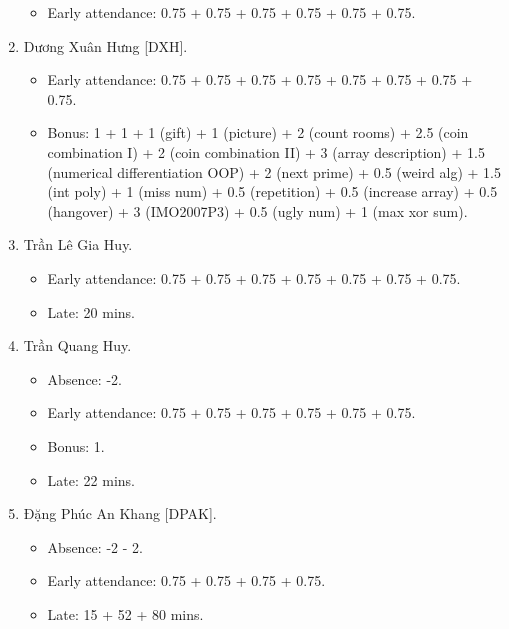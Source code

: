 \documentclass{article}
\begin{document}
\begin{enumerate}
\begin{itemize}
		\item Early attendance: 0.75 + 0.75 + 0.75 + 0.75 + 0.75 + 0.75.
	\end{itemize}
	\item {\sc Dương Xuân Hưng [DXH].}
	\begin{itemize}
		\item Early attendance: 0.75 + 0.75 + 0.75 + 0.75 + 0.75 + 0.75 + 0.75 + 0.75.
		\item Bonus: 1 + 1 + 1 (gift) + 1 (picture) + 2 (count rooms) + 2.5 (coin combination I) + 2 (coin combination II) + 3 (array description) + 1.5 (numerical differentiation OOP) + 2 (next prime) + 0.5 (weird alg) + 1.5 (int poly) + 1 (miss num) + 0.5 (repetition) + 0.5 (increase array) + 0.5 (hangover) + 3 (IMO2007P3) + 0.5 (ugly num) + 1 (max xor sum).
	\end{itemize}
	\item {\sc Trần Lê Gia Huy.}
	\begin{itemize}
		\item Early attendance: 0.75 + 0.75 + 0.75 + 0.75 + 0.75 + 0.75 + 0.75.
        \item Late: 20 mins.
	\end{itemize}
	\item {\sc Trần Quang Huy.}
	\begin{itemize}
		\item Absence: -2.
		\item Early attendance: 0.75 + 0.75 + 0.75 + 0.75 + 0.75 + 0.75.
        \item Bonus: 1.
        \item Late: 22 mins.
	\end{itemize}
	\item {\sc Đặng Phúc An Khang [DPAK].}
	\begin{itemize}
        \item Absence: -2 - 2.
		\item Early attendance: 0.75 + 0.75 + 0.75 + 0.75.
		\item Late: 15 + 52 + 80 mins.

\end{itemize}
\end{enumerate}
\end{document}
